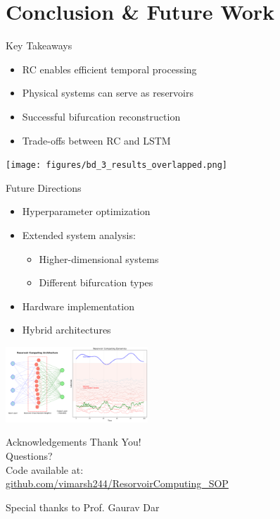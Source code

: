 \documentclass{beamer}
\begin{document}
\section{Conclusion \& Future Work}
\begin{frame}{Key Takeaways}
  \begin{itemize}
    \item RC enables efficient temporal processing
    \item Physical systems can serve as reservoirs
    \item Successful bifurcation reconstruction
    \item Trade-offs between RC and LSTM
  \end{itemize}
  \vspace{5mm}
  \centering
  \texttt{[image: figures/bd\_3\_results\_overlapped.png]}
\end{frame}

\begin{frame}{Future Directions}
  \begin{itemize}
    \item Hyperparameter optimization
    \item Extended system analysis:
    \begin{itemize}
      \item Higher-dimensional systems
      \item Different bifurcation types
    \end{itemize}
    \item Hardware implementation
    \item Hybrid architectures
  \end{itemize}
  \vspace{5mm}
  \centering
  \includegraphics[width=0.4\textwidth]{ivt-style/rc_intro_matplotlib.png}
\end{frame}

\begin{frame}{Acknowledgements}
  \centering
  \Large
  Thank You!\\
  \vspace{1cm}
  Questions?\\
  \vspace{1cm}
  \small
  Code available at:\\
  \href{https://github.com/vimarsh244/ResorvoirComputing_SOP}{github.com/vimarsh244/ResorvoirComputing\_SOP}
  
  \vspace{0.5cm}
  Special thanks to Prof. Gaurav Dar
\end{frame}
\end{document}

